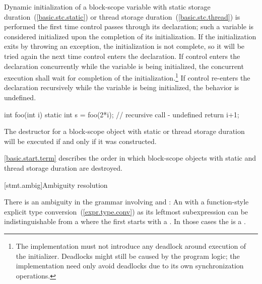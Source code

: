 \pnum
{}%
%
%
%
Dynamic initialization of a block-scope variable with
static storage duration~(\ref{basic.stc.static}) or
thread storage duration~(\ref{basic.stc.thread}) is performed
the first time control passes through its declaration; such a variable is
considered initialized upon the completion of its initialization. If the
initialization exits by throwing an exception, the initialization is not
complete, so it will be tried again the next time control enters the
declaration.
If control enters the declaration concurrently while the variable is
being initialized, the concurrent execution shall wait for completion
of the initialization.\footnote{The implementation must not introduce
any deadlock around execution of the initializer. Deadlocks might
still be caused by the program logic; the implementation need only
avoid deadlocks due to its own synchronization operations.} If control
re-enters the declaration recursively while
the variable is being initialized, the behavior is undefined.
\begin{example}

\begin{codeblock}
int foo(int i) {
  static int s = foo(2*i);      // recursive call - undefined
  return i+1;
}
\end{codeblock}
\end{example}

\pnum
{}%
The destructor for a block-scope object with static or thread storage duration will be
executed if and only if it was constructed.
\begin{note}
\ref{basic.start.term} describes the order in which block-scope objects with
static and thread storage duration are destroyed.
\end{note}

[stmt.ambig]{Ambiguity resolution}%

\pnum
There is an ambiguity in the grammar involving
 and : An
 with a function-style explicit type
conversion~(\ref{expr.type.conv}) as its leftmost subexpression can be
indistinguishable from a  where the first
 starts with a \tcode{(}. In those cases the
 is a .

